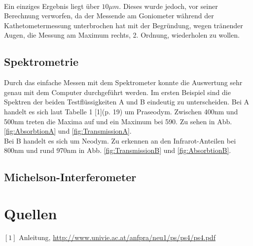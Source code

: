 \documentclass[12pt,a4paper]{article}
\begin{document}
\begin{multicols}{2}
\\
Ein einziges Ergebnis liegt über $10\mu m$. Dieses wurde jedoch, vor seiner Berechnung verworfen, da der Messende am Goniometer während der Kathetometermessung unterbrochen hat mit der Begründung, wegen tränender Augen, die Messung am Maximum rechts, 2. Ordnung, wiederholen zu wollen.\\



\subsection{Spektrometrie}
Durch das einfache Messen mit dem Spektrometer konnte die Auswertung sehr genau mit dem Computer durchgeführt werden. Im ersten Beispiel sind die Spektren der beiden Testflüssigkeiten A und B eindeutig zu unterscheiden. Bei A handelt es sich laut Tabelle 1 [1](p. 19) um Praseodym. Zwischen 400nm und 500nm treten die Maxima auf und ein Maximum bei 590. Zu sehen in Abb. \ref{fig:AbsorbtionA} und \ref{fig:TransmissionA}.\\
Bei B handelt es sich um Neodym. Zu erkennen an den Infrarot-Anteilen bei 800nm und rund 970nm in Abb. \ref{fig:TransmissionB} und \ref{fig:AbsorbtionB}.\\




\subsection{Michelson-Interferometer}


\section{Quellen}
$[1]$ Anleitung, \url{http://www.univie.ac.at/anfpra/neu1/ps/ps4/ps4.pdf}\\
\end{multicols}
\end{document}
